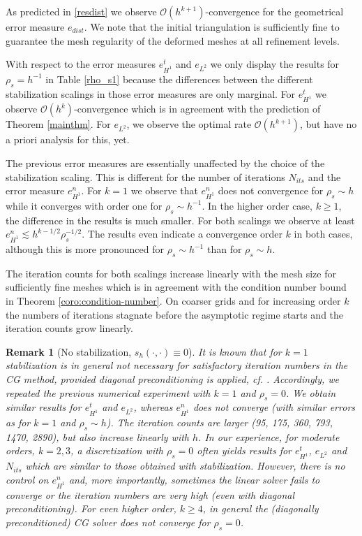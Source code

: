 \documentclass[final]{siamltex}
\newtheorem{remark}{Remark}
\begin{document}
As predicted in \eqref{resdist} we observe $\mathcal{O}(h^{k+1})$-convergence for the geometrical error measure $e_{dist}$. We note that the initial triangulation is sufficiently fine to guarantee the mesh regularity of the deformed meshes at all refinement levels.

With respect to the error measures $e_{H^1}^t$ and $e_{L^2}$ we only display the results for $\rho_s = h^{-1}$ in Table \ref{rho_s1} because the differences between the different stabilization scalings in those error measures are only marginal. For $e_{H^1}^t$
we observe $\mathcal{O}(h^k)$-convergence which is in agreement with the prediction of Theorem \ref{mainthm}. For $e_{L^2}$, we observe the optimal rate $\mathcal{O}(h^{k+1})$, but have no a priori analysis for this, yet.

The previous error measures are essentially unaffected by the choice of the stabilization scaling. This is different for the number of iterations $N_{its}$ and the error measure $e_{H^1}^n$. 
For $k=1$ we observe that $e_{H^1}^n$ does not convergence for $\rho_s\sim h$ while it converges with order one for $\rho_s \sim h^{-1}$. 
In the higher order case, $k\geq 1$, the difference in the results is much smaller. For both scalings we observe at least $e_{H^1}^n \lesssim h^{k-1/2} \rho_s^{-1/2}$. The results even indicate a convergence order $k$ in both cases, although this is more pronounced for $\rho_s \sim h^{-1}$ than for $\rho_s \sim h$.

The iteration counts for both scalings increase linearly with the mesh size for sufficiently fine meshes which is in agreement with the condition number bound in Theorem \ref{coro:condition-number}. On coarser grids and for increasing order $k$ the numbers of iterations stagnate before the asymptotic regime starts and the iteration counts grow linearly. 

\begin{remark}[No stabilization, $s_h(\cdot,\cdot) \equiv 0$] \rm
It is known that for $k=1$  stabilization is in general not necessary for satisfactory iteration numbers in the CG method, provided diagonal preconditioning is applied, cf. \cite{reusken10matrixprop}. Accordingly, we repeated the previous numerical experiment with $k=1$ and $\rho_s=0$. We obtain similar results for $e_{H^1}^t$ and $e_{L^2}$, whereas $e_{H^1}^n$ does not converge (with similar errors as for $k=1$ and $\rho_s \sim h$). The iteration counts are larger (95, 175, 360, 793, 1470, 2890), but also increase linearly with $h$.
In our experience, for moderate orders, $k=2,3$, a discretization with $\rho_s=0$  \emph{often}  yields results for $e_{H^1}^t$, $e_{L^2}$ and $N_{its}$ which are similar to those obtained with stabilization. However, there is no control on $e_{H^1}^n$ and, more importantly, \emph{sometimes} the linear solver fails to converge or the iteration numbers are very high (even with diagonal preconditioning). For even higher order, $k \geq 4$, in general the (diagonally preconditioned) CG solver does not converge for $\rho_s=0$.
\end{remark}
\end{document}
